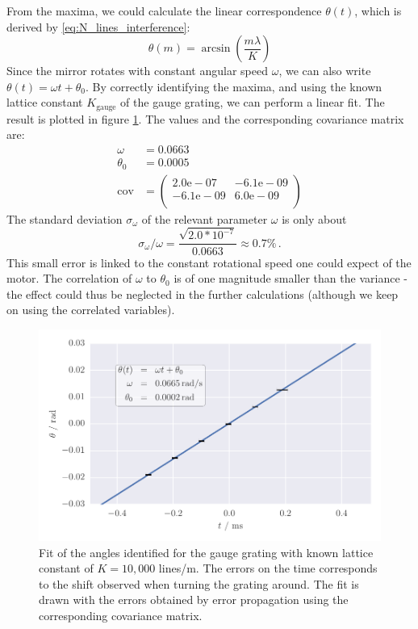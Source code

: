 From the maxima, we could calculate the linear correspondence $\theta(t)$, 
which is derived by \ref{eq:N_lines_interference}:
\begin{equation}
    \theta(m) = \arcsin\left(\frac{m \lambda}{K}\right)
\end{equation}
Since the mirror rotates with constant angular speed $\omega$, we can 
also write $\theta(t) = \omega t + \theta_0$. By correctly identifying the maxima, and using the 
known lattice constant $K_\mathrm{gauge}$ of the gauge grating, we can perform a linear fit.
The result is plotted in figure \ref{fig:calibrate_fit}. The values and the corresponding 
covariance matrix are: 
\begin{align}
	\omega &= 0.0663 \\
	\theta_0 &= 0.0005 \\
	\mathrm{cov} &=
	\begin{pmatrix}
		2.0\mathrm{e}-07 &-6.1\mathrm{e}-09 \\
		-6.1\mathrm{e}-09 &6.0\mathrm{e}-09 \\
	\end{pmatrix} 
\end{align}
The standard deviation $\sigma_\omega$ of the relevant parameter $\omega$ is only about 
\begin{equation}
    \sigma_\omega / \omega = \frac{\sqrt{2.0 * 10^{-7}}}{0.0663} \approx 0.7 \% \, .
\end{equation}
This small error is linked to the constant rotational speed 
one could expect of the motor. The correlation of $\omega$ to $\theta_0$ is of one magnitude smaller 
than the variance - the effect could thus be neglected in the further calculations (although we keep 
    on using the correlated variables).

\begin{figure}[htpb]
    \centering
    \includegraphics[width=1.0\linewidth]{figures/calibrate_fit}
    \caption{
        Fit of the angles identified for the gauge grating with known 
        lattice constant of $K = 10,000$ lines/m. The errors on the time corresponds to the
        shift observed when turning the grating around. The fit is drawn with the errors obtained 
        by error propagation using the corresponding covariance matrix.
        }
    \label{fig:calibrate_fit}
\end{figure}

